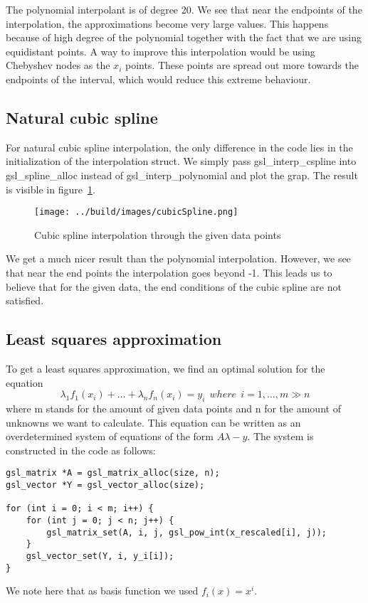 \documentclass[11pt, a4paper, titlepage, openright]{article}
\begin{document}
    The polynomial interpolant is of degree 20. We see that near the endpoints of the interpolation, the approximations
    become very large values. This happens because of high degree of the polynomial together with the fact that
    we are using equidistant points.
    A way to improve this interpolation would be using Chebyshev nodes as the \( x_i \) points.
    These points are spread out more towards the endpoints of the interval, which would reduce this extreme behaviour.

\subsection{Natural cubic spline}
    For natural cubic spline interpolation, the only difference in the code lies in the initialization of the
    interpolation struct. We simply pass gsl\_interp\_cspline into gsl\_spline\_alloc instead of gsl\_interp\_polynomial
    and plot the grap. The result is visible in figure~\ref{fig:spline1}.
    \begin{figure}[H]
        \centering
        \texttt{[image: ../build/images/cubicSpline.png]}
        \caption{Cubic spline interpolation through the given data points}
        \label{fig:spline1}
    \end{figure}
    We get a much nicer result than the polynomial interpolation.
    However, we see that near the end points the interpolation goes beyond -1.
    This leads us to believe that for the given data, the end conditions of the cubic spline are not satisfied.

\subsection{Least squares approximation}
To get a least squares approximation, we find an optimal solution for the equation
    \[ \lambda_1 f_1(x_i) + ... +  \lambda_n f_n(x_i) = y_i \ \ where \ \ i = 1,...,m \gg n \]
where m stands for the amount of given data points and n for the amount of unknowns we want to calculate.
This equation can be written as an overdetermined system of equations of the form \(A\lambda - y\).
The system is constructed in the code as follows:
\begin{lstlisting}
gsl_matrix *A = gsl_matrix_alloc(size, n);
gsl_vector *Y = gsl_vector_alloc(size);

for (int i = 0; i < m; i++) {
    for (int j = 0; j < n; j++) {
        gsl_matrix_set(A, i, j, gsl_pow_int(x_rescaled[i], j));
    }
    gsl_vector_set(Y, i, y_i[i]);
}
\end{lstlisting}
We note here that as basis function we used \( f_i(x) = x^i  \).
\end{document}
